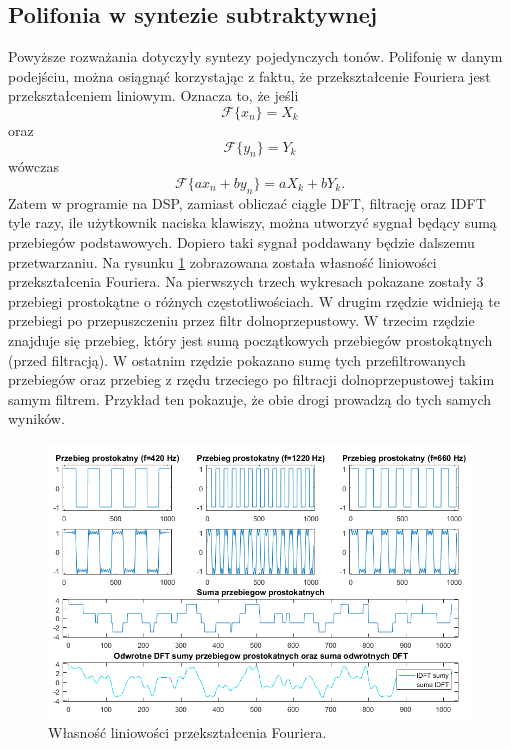 \subsection{Polifonia w syntezie subtraktywnej}
Powyższe rozważania dotyczyły syntezy pojedynczych tonów. Polifonię w danym podejściu, można osiągnąć korzystając z faktu, że przekształcenie Fouriera jest przekształceniem liniowym. Oznacza to, że jeśli
 \begin{equation} \label{equ:sub_5}
 \mathcal{F}\{x_n\} = X_k
 \end{equation}
 oraz 
  \begin{equation} \label{equ:sub_6}
 \mathcal{F}\{y_n\} = Y_k
 \end{equation}
 wówczas
  \begin{equation} \label{equ:sub_7}
\mathcal{F}\{ax_n + by_n\} = aX_k + bY_k.
\end{equation} 
Zatem w programie na DSP, zamiast obliczać ciągle DFT, filtrację oraz IDFT tyle razy, ile użytkownik naciska klawiszy, można utworzyć sygnał będący sumą przebiegów podstawowych. Dopiero taki sygnał poddawany będzie dalszemu przetwarzaniu. Na rysunku \ref{rys:sub_linearity}	zobrazowana została własność liniowości przekształcenia Fouriera. Na pierwszych trzech wykresach pokazane zostały 3 przebiegi prostokątne o różnych częstotliwościach. W drugim rzędzie widnieją te przebiegi po przepuszczeniu przez filtr dolnoprzepustowy. W trzecim rzędzie znajduje się przebieg, który jest sumą początkowych przebiegów prostokątnych (przed filtracją). W ostatnim rzędzie pokazano sumę tych przefiltrowanych przebiegów oraz przebieg z rzędu trzeciego po filtracji dolnoprzepustowej takim samym filtrem. Przykład ten pokazuje, że obie drogi prowadzą do tych samych wyników.
\begin{figure}[H]
	\centering
	\includegraphics[width=16cm]{grafiki/sub_linearity}
	\captionsetup{justification=centering}
	\caption{Własność liniowości przekształcenia Fouriera.}
	\label{rys:sub_linearity}
\end{figure}

